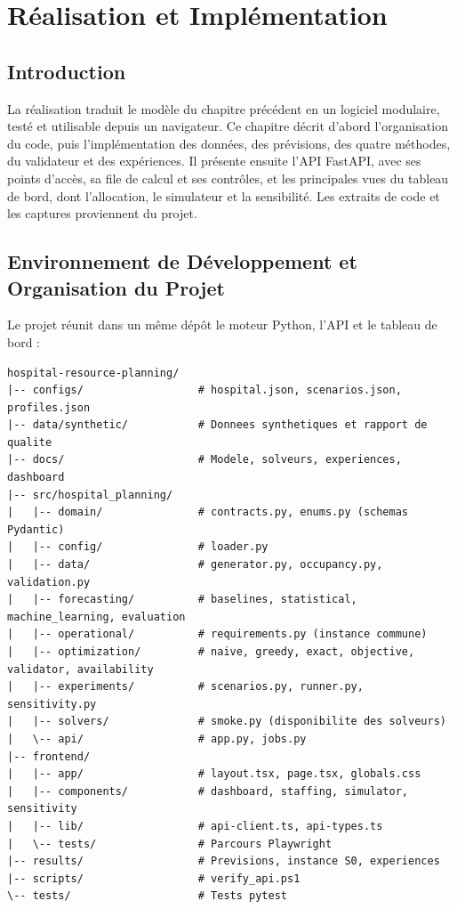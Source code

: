 \chapter{Réalisation et Implémentation}
\label{ch:realisation_implementation}

\section*{Introduction}
La réalisation traduit le modèle du chapitre précédent en un logiciel modulaire, testé et utilisable depuis un navigateur. Ce chapitre décrit d'abord l'organisation du code, puis l'implémentation des données, des prévisions, des quatre méthodes, du validateur et des expériences. Il présente ensuite l'API FastAPI, avec ses points d'accès, sa file de calcul et ses contrôles, et les principales vues du tableau de bord, dont l'allocation, le simulateur et la sensibilité. Les extraits de code et les captures proviennent du projet.

\section{Environnement de Développement et Organisation du Projet}

Le projet réunit dans un même dépôt le moteur Python, l'API et le tableau de bord :

\begin{lstlisting}[caption={Structure arborescente du projet (fichiers principaux).}]
hospital-resource-planning/
|-- configs/                  # hospital.json, scenarios.json, profiles.json
|-- data/synthetic/           # Donnees synthetiques et rapport de qualite
|-- docs/                     # Modele, solveurs, experiences, dashboard
|-- src/hospital_planning/
|   |-- domain/               # contracts.py, enums.py (schemas Pydantic)
|   |-- config/               # loader.py
|   |-- data/                 # generator.py, occupancy.py, validation.py
|   |-- forecasting/          # baselines, statistical, machine_learning, evaluation
|   |-- operational/          # requirements.py (instance commune)
|   |-- optimization/         # naive, greedy, exact, objective, validator, availability
|   |-- experiments/          # scenarios.py, runner.py, sensitivity.py
|   |-- solvers/              # smoke.py (disponibilite des solveurs)
|   \-- api/                  # app.py, jobs.py
|-- frontend/
|   |-- app/                  # layout.tsx, page.tsx, globals.css
|   |-- components/           # dashboard, staffing, simulator, sensitivity
|   |-- lib/                  # api-client.ts, api-types.ts
|   \-- tests/                # Parcours Playwright
|-- results/                  # Previsions, instance S0, experiences
|-- scripts/                  # verify_api.ps1
\-- tests/                    # Tests pytest
\end{lstlisting}

